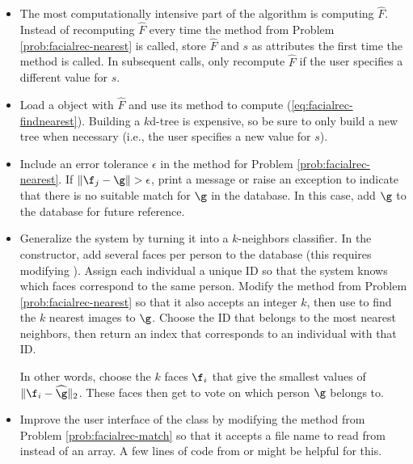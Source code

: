\begin{itemize}
    \item The most computationally intensive part of the algorithm is computing $\widehat{F}$.
    Instead of recomputing $\widehat{F}$ every time the method from Problem \ref{prob:facialrec-nearest} is called, store $\widehat{F}$ and $s$ as attributes the first time the method is called.
    In subsequent calls, only recompute $\widehat{F}$ if the user specifies a different value for $s$.

    \item Load a  object with $\widehat{F}$ and use its  method to compute (\ref{eq:facialrec-findnearest}).
    Building a $k$d-tree is expensive, so be sure to only build a new tree when necessary (i.e., the user specifies a new value for $s$).

    \item Include an error tolerance $\epsilon$ in the method for Problem \ref{prob:facialrec-nearest}.
    If $\|\f_j - \g\| > \epsilon$, print a message or raise an exception to indicate that there is no suitable match for $\g$ in the database.
    In this case, add $\g$ to the database for future reference.

    \item Generalize the system by turning it into a $k$-neighbors classifier.
    In the constructor, add several faces per person to the database (this requires modifying ).
    Assign each individual a unique ID so that the system knows which faces correspond to the same person.
    Modify the method from Problem \ref{prob:facialrec-nearest} so that it also accepts an integer $k$, then use  to find the $k$ nearest images to $\g$.
    Choose the ID that belongs to the most nearest neighbors, then return an index that corresponds to an individual with that ID.

    In other words, choose the $k$ faces $\f_i$ that give the smallest values of $\|\f_i - \widehat{\g}\|_2$.
    These faces then get to vote on which person $\g$ belongs to.

    \item Improve the user interface of the class by modifying the method from Problem \ref{prob:facialrec-match} so that it accepts a file name to read from instead of an array.
    A few lines of code from  or  might be helpful for this.
\end{itemize}

